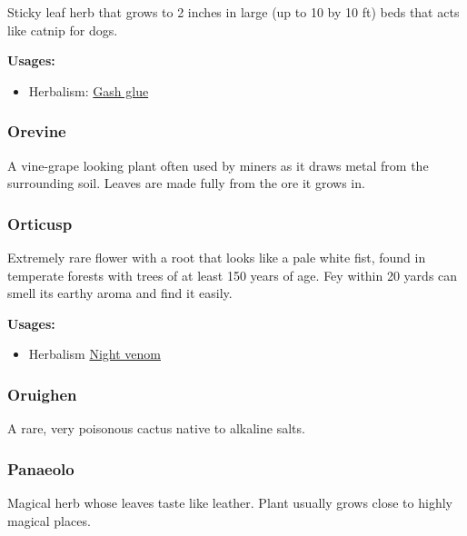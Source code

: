 Sticky leaf herb that grows to 2 inches in large (up to 10 by 10 ft) beds that acts like catnip for dogs.

\vspace{5mm}

\textbf{Usages:}

\begin{itemize}[noitemsep]
\item[] Herbalism: \hyperref[Gash glue]{Gash glue}
\end{itemize}

\subsubsection{Orevine}

A vine-grape looking plant often used by miners as it draws metal from the surrounding soil. Leaves are made fully from the ore it grows in.

\subsubsection{Orticusp}
\label{Orticusp}

Extremely rare flower with a root that looks like a pale white fist, found in temperate forests with trees of at least 150 years of age. Fey within 20 yards can smell its earthy aroma and find it easily.

\vspace{5mm}

\textbf{Usages:}

\begin{itemize}[noitemsep]
\item[] Herbalism \hyperref[Night venom]{Night venom}
\end{itemize}

\subsubsection{Oruighen}

A rare, very poisonous cactus native to alkaline salts.

\subsubsection{Panaeolo}
\label{Panaeolo}

Magical herb whose leaves taste like leather. Plant usually grows close to highly magical places.

\vspace{5mm}

